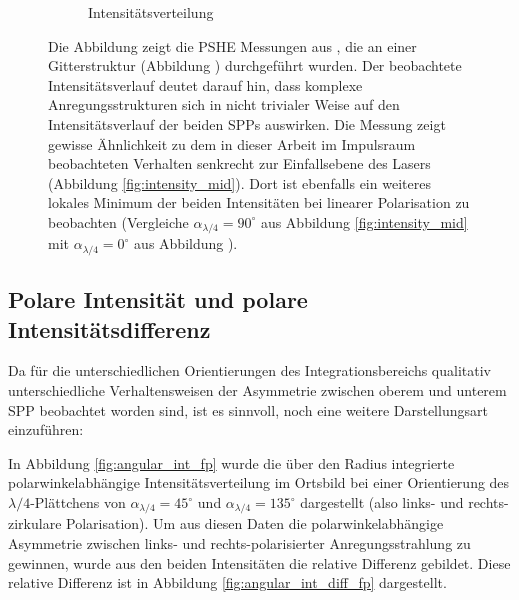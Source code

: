 \documentclass[a4paper, titlepage,  ngerman, fullpage]{book}
\begin{document}
\begin{figure}
\begin{subfigure}{0.49\textwidth}
			\caption{Intensitätsverteilung}
			\label{fig:RF_measure_int}
		\end{subfigure}
		\caption[Vergleichsmessung aus \cite{RodriguezFortuno.2013}]{Die Abbildung  zeigt die PSHE Messungen aus \cite{RodriguezFortuno.2013}, die an einer Gitterstruktur (Abbildung ) durchgeführt wurden. Der beobachtete Intensitätsverlauf deutet darauf hin, dass komplexe Anregungsstrukturen sich in nicht trivialer Weise auf den Intensitätsverlauf der beiden SPPs auswirken. Die Messung zeigt gewisse Ähnlichkeit zu dem in dieser Arbeit im Impulsraum beobachteten Verhalten senkrecht zur Einfallsebene des Lasers (Abbildung \ref{fig:intensity_mid}). Dort ist ebenfalls ein weiteres lokales Minimum der beiden Intensitäten bei linearer Polarisation zu beobachten (Vergleiche $\alpha_{\lambda/4}= 90^\circ$ aus Abbildung \ref{fig:intensity_mid} mit $\alpha_{\lambda/4}= 0^\circ$ aus Abbildung ).}
		\label{fig:RF_measure}		
	\end{figure}
	\FloatBarrier
	\subsection{Polare Intensität und polare Intensitätsdifferenz}
		\label{sec:polar_int}	
		Da für die unterschiedlichen Orientierungen des Integrationsbereichs qualitativ unterschiedliche Verhaltensweisen der Asymmetrie zwischen oberem und unterem SPP beobachtet worden sind, ist es sinnvoll, noch eine weitere Darstellungsart einzuführen:		
		
		 In Abbildung \ref{fig:angular_int_fp} wurde die über den Radius integrierte polarwinkelabhängige Intensitätsverteilung im Ortsbild bei einer Orientierung des $\lambda / 4$-Plättchens von $\alpha_{\lambda/4} = 45^\circ$ und  $\alpha_{\lambda/4} = 135^\circ$ dargestellt (also links- und rechts-zirkulare Polarisation). Um aus diesen Daten die polarwinkelabhängige Asymmetrie zwischen links- und rechts-polarisierter Anregungsstrahlung zu gewinnen, wurde aus den beiden Intensitäten die relative Differenz gebildet. Diese relative Differenz ist in Abbildung \ref{fig:angular_int_diff_fp} dargestellt.
\end{document}
